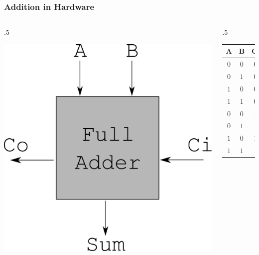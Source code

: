 \documentclass[aspectratio=169]{beamer}
\begin{document}
\begin{frame}
  \frametitle{Addition in Hardware}
  
  \begin{columns}
    \begin{column}{.5\textwidth}
  
    \includegraphics[width=.95\textwidth]{arithgfx/full_adder.png}
    \end{column}
    
    \begin{column}{.5\textwidth}
      \begin{tabular}{c c c|c c}
      A & B & Ci & Sum & Co \\
      \hline
      $0$ & $0$ & $0$ & $0$ & $0$ \\
      $0$ & $1$ & $0$ & $1$ & $0$ \\
      $1$ & $0$ & $0$ & $1$ & $0$ \\
      $1$ & $1$ & $0$ & $0$ & $1$ \\
      $0$ & $0$ & $1$ & $1$ & $0$ \\
      $0$ & $1$ & $1$ & $0$ & $1$ \\
      $1$ & $0$ & $1$ & $0$ & $1$ \\
      $1$ & $1$ & $1$ & $1$ & $1$ \\
      \end{tabular}
    \end{column}
  \end{columns}
\end{frame}
\end{document}
